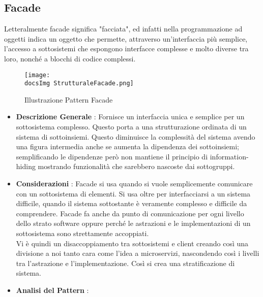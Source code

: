 {{		\subsection{Facade}{
			Letteralmente facade significa "facciata", ed infatti nella programmazione ad oggetti indica un oggetto che permette, attraverso un'interfaccia più semplice, l'accesso a sottosistemi che espongono interfacce complesse e molto diverse tra loro, nonché a blocchi di codice complessi.
			
			\begin{figure}[H]
				\centering
				\texttt{[image: \\docsImg StrutturaleFacade.png]}
				\caption{Illustrazione Pattern Facade}
				\label{Illustrazione Pattern Facade}
			\end{figure}
			
			\begin{itemize}\itemsep1pt
				\item \textbf{Descrizione Generale} : Fornisce un interfaccia unica e semplice per un sottosistema complesso. Questo porta a una strutturazione ordinata di un sistema di sottoinsiemi. Questo diminuisce la complessità del sistema avendo una figura intermedia anche se aumenta la dipendenza dei sottoinsiemi; semplificando le dipendenze però non mantiene il principio di information-hiding mostrando funzionalità che sarebbero nascoste dai sottogruppi.
				\item \textbf{Considerazioni} : Facade si usa quando si vuole semplicemente comunicare con un sottosistema di elementi. Si usa oltre per interfacciarsi a un sistema difficile, quando il sistema sottostante è veramente complesso e difficile da comprendere. Facade fa anche da punto di comunicazione per ogni livello dello strato software oppure perché le astrazioni e le implementazioni di un sottosistema sono strettamente accoppiati.\\
				Vi è quindi un disaccoppiamento tra sottosistemi e client creando così una divisione a noi tanto cara come l'idea a microservizi, nascondendo così i livelli tra l'astrazione e l'implementazione. Così si crea una stratificazione di sistema.
				\item \textbf{Analisi del Pattern} : \hfill
				

\end{itemize}}}}
